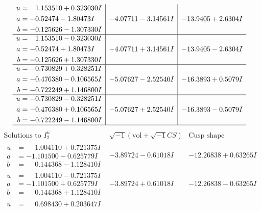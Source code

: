 \documentclass[1p]{elsarticle_modified}
\theoremstyle{definition}
\newcommand{\I}{\sqrt{-1}}
\begin{document}
$$\begin{array}{c|c|c}
\begin{aligned}
u &= \phantom{-}1.153510 + 0.323030 I \\
a &= -0.52474 - 1.80473 I \\
b &= -0.125626 - 1.307330 I\end{aligned}
 & -4.07711 - 3.14561 I & -13.9405 + 2.6304 I \\ \hline\begin{aligned}
u &= \phantom{-}1.153510 - 0.323030 I \\
a &= -0.52474 + 1.80473 I \\
b &= -0.125626 + 1.307330 I\end{aligned}
 & -4.07711 + 3.14561 I & -13.9405 - 2.6304 I \\ \hline\begin{aligned}
u &= -0.730829 + 0.328251 I \\
a &= -0.476380 - 0.106565 I \\
b &= -0.722249 + 1.146800 I\end{aligned}
 & -5.07627 - 2.52540 I & -16.3893 + 0.5079 I \\ \hline\begin{aligned}
u &= -0.730829 - 0.328251 I \\
a &= -0.476380 + 0.106565 I \\
b &= -0.722249 - 1.146800 I\end{aligned}
 & -5.07627 + 2.52540 I & -16.3893 - 0.5079 I\\
 \hline 
 \end{array}$$\newpage$$\begin{array}{c|c|c}  
\text{Solutions to }I^u_{2}& \I (\text{vol} + \sqrt{-1}CS) & \text{Cusp shape}\\
 \hline 
\begin{aligned}
u &= \phantom{-}1.004110 + 0.721375 I \\
a &= -1.101500 - 0.625779 I \\
b &= \phantom{-}0.144368 - 1.128410 I\end{aligned}
 & -3.89724 - 0.61018 I & -12.26838 + 0.63265 I \\ \hline\begin{aligned}
u &= \phantom{-}1.004110 - 0.721375 I \\
a &= -1.101500 + 0.625779 I \\
b &= \phantom{-}0.144368 + 1.128410 I\end{aligned}
 & -3.89724 + 0.61018 I & -12.26838 - 0.63265 I \\ \hline\begin{aligned}
u &= \phantom{-}0.698430 + 0.203647 I \\

\end{aligned}
\end{array}$$
\end{document}
